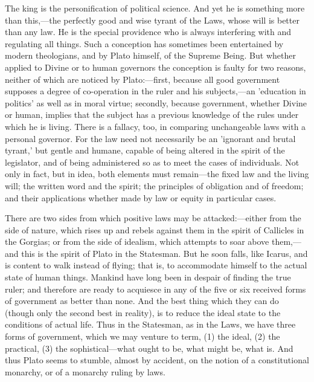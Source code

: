 \documentclass[11pt,letter]{article}
\begin{document}
\par  The king is the personification of political science. And yet he is something more than this,—the perfectly good and wise tyrant of the Laws, whose will is better than any law. He is the special providence who is always interfering with and regulating all things. Such a conception has sometimes been entertained by modern theologians, and by Plato himself, of the Supreme Being. But whether applied to Divine or to human governors the conception is faulty for two reasons, neither of which are noticed by Plato:—first, because all good government supposes a degree of co-operation in the ruler and his subjects,—an 'education in politics' as well as in moral virtue; secondly, because government, whether Divine or human, implies that the subject has a previous knowledge of the rules under which he is living. There is a fallacy, too, in comparing unchangeable laws with a personal governor. For the law need not necessarily be an 'ignorant and brutal tyrant,' but gentle and humane, capable of being altered in the spirit of the legislator, and of being administered so as to meet the cases of individuals. Not only in fact, but in idea, both elements must remain—the fixed law and the living will; the written word and the spirit; the principles of obligation and of freedom; and their applications whether made by law or equity in particular cases.

\par  There are two sides from which positive laws may be attacked:—either from the side of nature, which rises up and rebels against them in the spirit of Callicles in the Gorgias; or from the side of idealism, which attempts to soar above them,—and this is the spirit of Plato in the Statesman. But he soon falls, like Icarus, and is content to walk instead of flying; that is, to accommodate himself to the actual state of human things. Mankind have long been in despair of finding the true ruler; and therefore are ready to acquiesce in any of the five or six received forms of government as better than none. And the best thing which they can do (though only the second best in reality), is to reduce the ideal state to the conditions of actual life. Thus in the Statesman, as in the Laws, we have three forms of government, which we may venture to term, (1) the ideal, (2) the practical, (3) the sophistical—what ought to be, what might be, what is. And thus Plato seems to stumble, almost by accident, on the notion of a constitutional monarchy, or of a monarchy ruling by laws.
\end{document}
